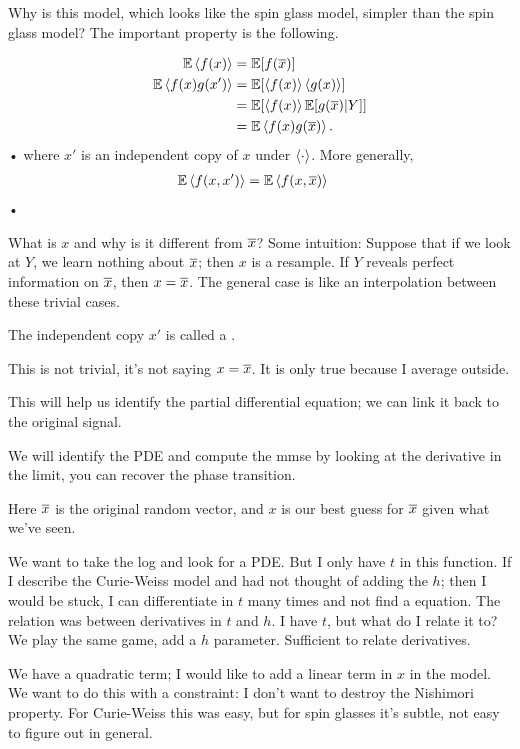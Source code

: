 Why is this model, which looks like the spin glass model, simpler than the spin glass model? The important property is the following.
\begin{pr}[Nishimori]
\begin{align*}
\mathbb{E}\left\langle {f(x)}\right\rangle &= \mathbb{E}[f(\overline{x})]\\
\mathbb{E}\left\langle {f(x)g(x')}\right\rangle &= \mathbb{E}[\left\langle {f(x)}\right\rangle\left\langle {g(x)}\right\rangle]\\
&=\mathbb{E}[\left\langle {f(x)}\right\rangle\mathbb{E}[g(\overline{x})|Y]]\\
&= \mathbb{E}\left\langle {f(x) g(\overline{x})}\right\rangle.
\end{align*}•
where $x'$ is an independent copy of $x$ under $\left\langle {\cdot}\right\rangle$.
More generally,
\begin{align*}
\mathbb{E}\left\langle {f(x,x')}\right\rangle &= \mathbb{E}\left\langle {f(x,\overline{x})}\right\rangle
\end{align*}•
\end{pr}
What is $x$ and why is it different from $\overline{x}$? Some intuition: Suppose that if we look at $Y$, we learn nothing about $\overline{x}$; then $x$ is a resample. If $Y$ reveals perfect information on $\overline{x}$, then $x=\overline{x}$. The general case is like an interpolation between these trivial cases.

The independent copy $x'$ is called a .

This is not trivial, it's not saying $x=\overline{x}$. It is only true because I average outside. 

This will help us identify the partial differential equation; we can link it back to the original signal. 


We will identify the PDE and compute the mmse by looking at the derivative in the limit, you can recover the phase transition.

Here $\overline{x}$ is the original random vector, and $x$ is our best guess for $\overline{x}$ given what we've seen. 

We want to take the log and look for a PDE. But I only have $t$ in this function. If I describe the Curie-Weiss model and had not thought of adding the $h$; then I would be stuck, I can differentiate in $t$ many times and not find a equation. The relation was between derivatives in $t$ and $h$. I have $t$, but what do I relate it to? We play the same game, add a $h$ parameter. Sufficient to relate derivatives.

We have a quadratic term; I would like to add a linear term in $x$ in the model. We want to do this with a constraint: I don't want to destroy the Nishimori property. For Curie-Weiss this was easy, but for spin glasses it's subtle, not easy to figure out in general.

